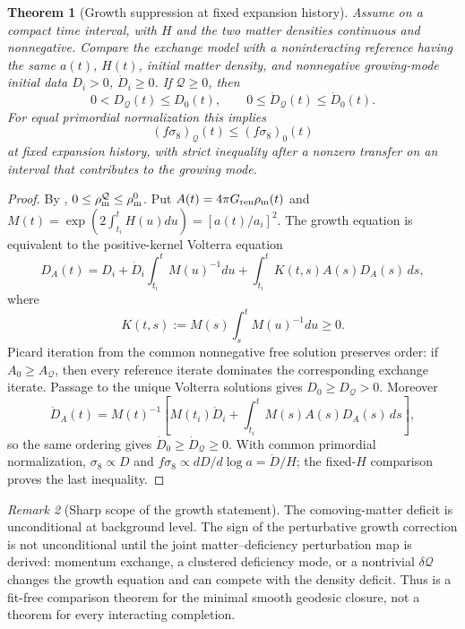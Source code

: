 \documentclass[11pt]{article}
\newtheorem{theorem}{Theorem}[section]
\theoremstyle{definition}
\theoremstyle{remark}
\newtheorem{remark}[theorem]{Remark}
\newcommand{\Gren}{G_{\mathrm{ren}}}
\begin{document}
\begin{theorem}[Growth suppression at fixed expansion history]
\label{thm:growth-sign-consistency}
Assume  on a compact time interval, with
\(H\) and the two matter densities continuous and nonnegative.  Compare the
exchange model with a noninteracting reference having the same \(a(t)\),
\(H(t)\), initial matter density, and nonnegative growing-mode initial data
\(D_i>0\), \(\dot D_i\ge0\).  If \(\mathcal Q\ge0\), then
\[
  0<D_{\mathcal Q}(t)\le D_0(t),
  \qquad
  0\le\dot D_{\mathcal Q}(t)\le\dot D_0(t).
\]
For equal primordial normalization this implies
\[
  \boxed{\qquad
  (f\sigma_8)_{\mathcal Q}(t)\le(f\sigma_8)_0(t)
  \qquad}
\]
at fixed expansion history, with strict inequality after a nonzero transfer on
an interval that contributes to the growing mode.
\end{theorem}

\begin{proof}
By ,
\(0\le\rho_{\rm m}^{\mathcal Q}\le\rho_{\rm m}^{0}\).  Put
\(A(t)=4\pi\Gren\rho_{\rm m}(t)\) and
\(M(t)=\exp(2\int_{t_i}^{t}H(u)du)=[a(t)/a_i]^2\).  The growth equation is
equivalent to the positive-kernel Volterra equation
\[
 D_A(t)=D_i+\dot D_i\int_{t_i}^{t}M(u)^{-1}du
 +\int_{t_i}^{t}K(t,s)A(s)D_A(s)\,ds,
\]
where
\[
 K(t,s):=M(s)\int_s^tM(u)^{-1}du\ge0.
\]
Picard iteration from the common nonnegative free solution preserves order:
if \(A_0\ge A_{\mathcal Q}\), then every reference iterate dominates the
corresponding exchange iterate.  Passage to the unique Volterra solutions gives
\(D_0\ge D_{\mathcal Q}>0\).  Moreover
\[
 \dot D_A(t)=M(t)^{-1}\left[
 M(t_i)\dot D_i+\int_{t_i}^{t}M(s)A(s)D_A(s)\,ds\right],
\]
so the same ordering gives \(\dot D_0\ge\dot D_{\mathcal Q}\ge0\).  With common
primordial normalization, \(\sigma_8\propto D\) and
\(f\sigma_8\propto dD/d\log a=\dot D/H\); the fixed-\(H\) comparison proves the
last inequality.
\end{proof}

\begin{remark}[Sharp scope of the growth statement]
\label{rem:growth-scope}
The comoving-matter deficit is unconditional at background level.  The sign of
the perturbative growth correction is not unconditional until the joint
matter--deficiency perturbation map is derived: momentum exchange, a clustered
deficiency mode, or a nontrivial \(\delta\mathcal Q\) changes the growth
equation and can compete with the density deficit.  Thus
 is a fit-free comparison theorem for the
minimal smooth geodesic closure, not a theorem for every interacting completion.
\end{remark}
\end{document}
